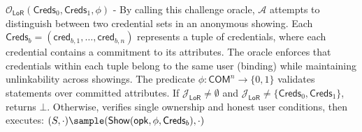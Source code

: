 \noindent $\mathcal{O}_{\mathsf{LoR}}(\mathsf{Creds}_0, \mathsf{Creds}_1, \phi)$ - By calling this challenge oracle, $\mathcal{A}$ attempts to distinguish between two credential sets in an anonymous showing. Each $\mathsf{Creds}_b = (\mathsf{cred}_{b,1},\ldots,\mathsf{cred}_{b,n})$ represents a tuple of credentials, where each credential contains a commitment to its attributes. The oracle enforces that credentials within each tuple belong to the same user (binding) while maintaining unlinkability across showings. The predicate $\phi: \mathsf{COM}^n \rightarrow \{0,1\}$ validates statements over committed attributes. If $\mathcal{J}_{\mathsf{LoR}} \neq \emptyset$ and $\mathcal{J}_{\mathsf{LoR}} \neq \{\mathsf{Creds}_0, \mathsf{Creds}_1\}$, returns $\bot$. Otherwise, verifies single ownership and honest user conditions, then executes:
$(S, \cdot) \sample (\mathsf{Show}(\mathsf{opk}, \phi, \mathsf{Creds}_b), \cdot)$

